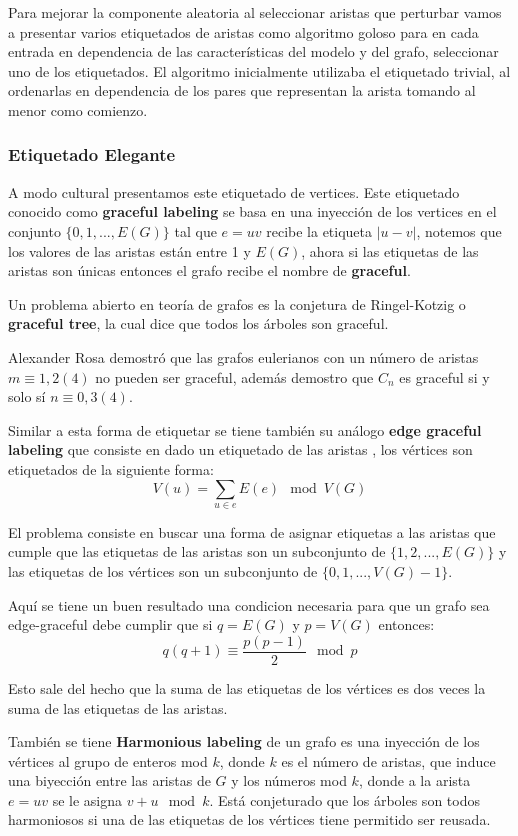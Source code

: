 \documentclass[a4paper]{article}
\begin{document}
Para mejorar la componente aleatoria al seleccionar aristas que perturbar vamos a presentar varios etiquetados de aristas como algoritmo goloso para en cada entrada en dependencia de las caracter\'isticas del modelo y del grafo, seleccionar uno de los etiquetados. El algoritmo inicialmente utilizaba el etiquetado trivial, al ordenarlas en dependencia de los pares que representan la arista tomando al menor como comienzo.

\subsubsection{Etiquetado Elegante}

A modo cultural presentamos este etiquetado de vertices. Este etiquetado conocido como \textbf{graceful labeling} se basa en una inyecci\'on de los vertices en el conjunto $\{0, 1, ..., E(G)\}$ tal que $e=uv$ recibe la etiqueta $|u - v|$, notemos que los valores de las aristas est\'an entre 1 y $E(G)$, ahora si las etiquetas de las aristas son \'unicas entonces el grafo recibe el nombre de \textbf{graceful}.

Un problema abierto en teor\'ia de grafos es la conjetura de Ringel-Kotzig o  \textbf{graceful tree}, la cual dice que todos los \'arboles son graceful.

Alexander Rosa demostr\'o que las grafos eulerianos con un n\'umero de aristas $m \equiv 1, 2 (4)$ no pueden ser graceful, adem\'as demostro que $C_n$ es graceful si y solo s\'i $n \equiv 0,3 (4)$.

Similar a esta forma de etiquetar se tiene tambi\'en su an\'alogo \textbf{edge graceful labeling} que consiste en dado un etiquetado de las aristas , los v\'ertices son etiquetados de la siguiente forma:
$$ V(u) = \sum_{u \in e} E(e) \mod V(G)$$

El problema consiste en buscar una forma de asignar etiquetas a las aristas que cumple que las etiquetas de las aristas son un subconjunto de $\{1,2, ..., E(G)\}$ y las etiquetas de los v\'ertices son un subconjunto de $\{0, 1, ..., V(G)-1\}$.

Aqu\'i se tiene un buen resultado una condicion necesaria para que un grafo sea edge-graceful debe cumplir que si $q = E(G)$ y $p = V(G)$ entonces:
$$q(q+1) \equiv \frac{p(p-1)}{2} \mod p$$

Esto sale del hecho que la suma de las etiquetas de los v\'ertices es dos veces la suma de las etiquetas de las aristas.

Tambi\'en se tiene \textbf{Harmonious labeling} de un grafo es una inyecci\'on de los v\'ertices al grupo de enteros mod  $k$, donde $k$ es el n\'umero de aristas, que induce una biyecci\'on entre las aristas de $G$ y los n\'umeros mod $k$, donde a la arista $e=uv$ se le asigna $v+u \mod k$. Est\'a conjeturado que los \'arboles son todos harmoniosos si una de las etiquetas de los v\'ertices tiene permitido ser reusada.
\end{document}
